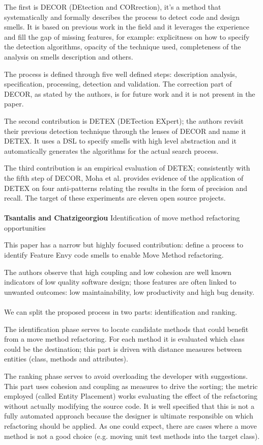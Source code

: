 The first is DECOR (DEtection and CORrection), it's a method that systematically and formally describes the process to detect code and design smells. It is based on previous work in the field and it leverages the experience and fill the gap of missing features, for example: explicitness on how to specify the detection algorithms, opacity of the technique used, completeness of the analysis on smells description and others. 

The process is defined through five well defined steps: description analysis, specification, processing, detection and validation. The correction part of DECOR, as stated by the authors, is for future work and it is not present in the paper.

The second contribution is DETEX (DETection EXpert); the authors revisit their previous detection technique through the lenses of DECOR and name it DETEX. It uses a DSL to specify smells with high level abstraction and it automatically generates the algorithms for the actual search process. 

The third contribution is an empirical evaluation of DETEX; consistently with the fifth step of DECOR, Moha et al. provides evidence of the application of DETEX on four anti-patterns relating the results in the form of precision and recall. The target of these experiments are eleven open source projects. 
\\
\\
\textbf{Tsantalis and Chatzigeorgiou} \cite{tsantalis2009identification} Identification of move method refactoring opportunities

This paper has a narrow but highly focused contribution: define a process to identify Feature Envy code smells to enable Move Method refactoring.

The authors observe that high coupling and low cohesion are well known indicators of low quality software design; those features are often linked to unwanted outcomes: low maintainability, low productivity and high bug density. 
\\
\\
We can split the proposed process in two parts: identification and ranking.

The identification phase serves to locate candidate methods that could benefit from a move method refactoring. For each method it is evaluated which class could be the destination; this part is driven with distance measures between entities (class, methods and attributes).

The ranking phase serves to avoid overloading the developer with suggestions. This part uses cohesion and coupling as measures to drive the sorting; the metric employed (called Entity Placement) works evaluating the effect of the refactoring without actually modifying the source code.
It is well specified that this is not a fully automated approach because the designer is ultimate responsible on which refactoring should be applied. As one could expect, there are cases where a move method is not a good choice (e.g. moving unit test methods into the target class).

